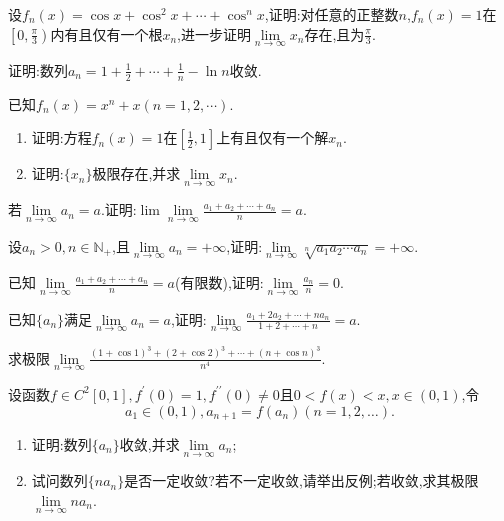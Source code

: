 \documentclass[UTF8,a4paper]{ctexart}
\begin{document}
\begin{example}[暨南大学,2023]
	设$f_n(x)=\cos x+\cos^2 x+\dotsb+\cos^n x$,证明:对任意的正整数$n$,$f_n(x)=1$在$\left[0,\frac{\pi}{3}\right)$内有且仅有一个根$x_n$,进一步证明$\lim\limits_{n\to\infty}x_n$存在,且为$\frac{\pi}{3}$.
\end{example}
\newpage
\begin{thinking}[中国科学院大学,2023]
	证明:数列$a_n=1+\frac{1}{2}+\dotsb+\frac{1}{n}-\ln n$收敛.
\end{thinking}
\begin{thinking}[北京邮电大学,2023]
	已知$f_n(x)=x^n+x(n=1,2,\cdots)$.
	\begin{enumerate}
		\item 证明:方程$f_n(x)=1$在$\left[\frac{1}{2},1\right]$上有且仅有一个解$x_n$.
		\item 证明:$\{x_n\}$极限存在,并求$\lim\limits_{n\to\infty}x_n$.
	\end{enumerate}
\end{thinking}
\newpage
\begin{example}[西南交通大学,2023]
	若$\lim\limits_{n\to\infty}a_n=a$.证明:$\lim\lim\limits_{n\to\infty}\frac{a_1+a_2+\dotsb+a_n}{n}=a$.
\end{example}
\begin{example}[长安大学,2023]
	设$a_n>0,n\in\mathbb{N_+}$,且$\lim\limits_{n\to\infty}a_n=+\infty$,证明:$\lim\limits_{n\to\infty}\sqrt[n]{a_1a_2\dotsm a_n}=+\infty$.
\end{example}
\newpage
\begin{thinking}[华南理工大学,2023]
	已知$\lim\limits_{n\to\infty}\frac{a_1+a_2+\dotsb+a_n}{n}=a$(有限数),证明:$\lim\limits_{n\to\infty}\frac{a_n}{n}=0$.
\end{thinking}
\begin{thinking}[暨南大学,2023]
	已知$\{a_n\}$满足$\lim\limits_{n\to\infty}a_n=a$,证明:$\lim\limits_{n\to\infty}\frac{a_1+2a_2+\dotsb+na_n}{1+2+\dotsb+n}=a$.
\end{thinking}
\newpage
\begin{example}[吉林大学,2023]
	求极限$\lim\limits_{n\to\infty}\frac{(1+\cos 1)^3+(2+\cos 2)^3+\cdots+(n+\cos n)^3}{n^4}$.
\end{example}
\begin{example}[电子科技大学,2023]
	设函数$f\in C^2\left[0,1\right],f^{\prime}(0)=1,f^{\prime\prime}\left(0\right)\neq 0$且$0<f(x)<x,x\in (0,1)$,令
	\begin{equation*}
		a_1\in (0,1),a_{n+1}=f(a_n)(n=1,2,\dots).
	\end{equation*}
\begin{enumerate}
	\item 证明:数列$\{a_n\}$收敛,并求$\lim\limits_{n\to\infty}a_n$;
	\item 试问数列$\{na_n\}$是否一定收敛?若不一定收敛,请举出反例;若收敛,求其极限$\lim\limits_{n\to\infty}na_n$.
\end{enumerate}
\end{example}
\end{document}
